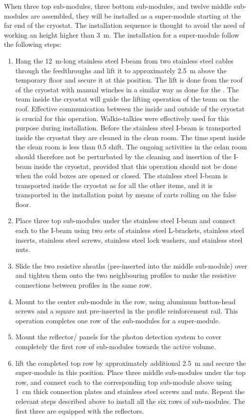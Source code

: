 When three top sub-modules, three bottom sub-modules, and twelve middle sub-modules are assembled, they will be installed as a super-module starting at the far end of the cryostat.
The installation sequence is thought to avoid the need of working an height higher than 3~m.
The installation for a super-module follow the following steps:
\begin{enumerate}
\item Hang the 12~m-long stainless steel I-beam from two stainless steel cables through the feedthroughs and lift it to approximately 2.5~m above the temporary floor and secure it at this position.
The lift is done from the roof of the cryostat with manual winches in a similar way as done for the .
The team inside the cryostat will guide the lifting operation of the team on the roof.
Effective communication between the inside and outside of the cryostat is crucial for this operation.
Walkie-talkies were effectively used for this purpose during  installation.
Before the stainless steel I-beam is transported inside the cryostat they are cleaned in the clean room.
The time spent inside the clean room is less than 0.5 shift.
The ongoing activities in the celan room should therefore not be perturbated by the cleaning and insertion of the I-beam inside the cryostat, provided that this operation should not be done when the cold boxes are opened or closed.
The stainless steel I-beam is transported inside the cryostat as for all the other items, and it is transported in the installation point by means of carts rolling on the false floor.
\item Place three top sub-modules under the stainless steel I-beam and connect each to the I-beam using two sets of stainless steel L-brackets, stainless steel inserts, stainless steel screws, stainless steel lock washers, and stainless steel nuts.
\item Slide the two resistive sheaths (pre-inserted into the middle sub-module) over and tighten them onto the two neighbouring profiles to make the resistive connections between profiles in the same row.
\item Mount  to the center sub-module in the row, using aluminum button-head screws and a square nut pre-inserted in the profile reinforcement rail.
This operation completes one row of the sub-modules for a super-module.
\item Mount the reflector/ panels for the photon detection system to cover completely the first row of sub-modules towards the active volume.
\item lift the completed top row by approximately additional 2.5~m and secure the super-module in this position.
Place three middle sub-modules under the top row, and connect each to the corresponding top sub-module above using 1~cm thick connection plates and stainless steel screws and nuts.
Repeat the relevant steps described above to install all the six raws of sub-modules.
The first three are equipped with the reflectors.
\end{enumerate}

